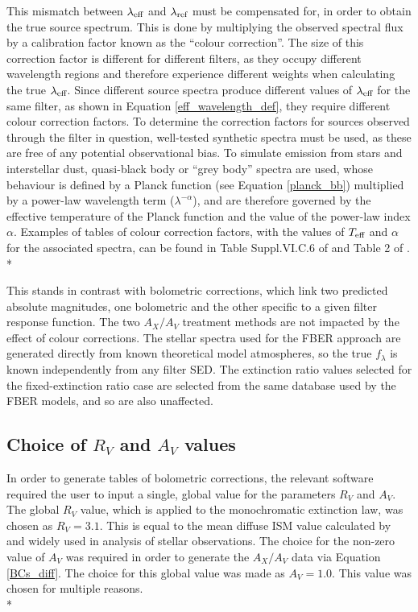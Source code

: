 \documentclass[12pt, a4paper]{report}
\begin{document}
This mismatch between $\lambda_{\textnormal{eff}}$ and $\lambda_{\textnormal{ref}}$ must be compensated for, in order to obtain the true source spectrum. This is done by multiplying the observed spectral flux by a calibration factor known as the ``colour correction''. The size of this correction factor is different for different filters, as they occupy different wavelength regions and therefore experience different weights when calculating the true $\lambda_{\textnormal{eff}}$. Since different source spectra produce different values of $\lambda_{\textnormal{eff}}$ for the same filter, as shown in Equation \ref{eff_wavelength_def}, they require different colour correction factors. To determine the correction factors for sources observed through the filter in question, well-tested synthetic spectra must be used, as these are free of any potential observational bias. To simulate emission from stars and interstellar dust, quasi-black body or ``grey body'' spectra are used, whose behaviour is defined by a Planck function (see Equation \ref{planck_bb}) multiplied by a power-law wavelength term ($\lambda^{-\alpha}$), and are therefore governed by the effective temperature of the Planck function and the value of the power-law index $\alpha$. Examples of tables of colour correction factors, with the values of $T_{\textnormal{eff}}$ and $\alpha$ for the associated spectra, can be found in Table Suppl.VI.C.6 of \cite{1988iras....1.....B} and Table 2 of \cite{2006A&A...447..769P}.\\*

This stands in contrast with bolometric corrections, which link two predicted absolute magnitudes, one bolometric and the other specific to a given filter response function. The two $A_{X}/A_{V}$ treatment methods are not impacted by the effect of colour corrections. The stellar spectra used for the FBER approach are generated directly from known theoretical model atmospheres, so the true $f_{\lambda}$ is known independently from any filter SED. The extinction ratio values selected for the fixed-extinction ratio case are selected from the same database used by the FBER models, and so are also unaffected.

\subsection{Choice of $R_{V}$ and $A_{V}$ values} \label{forbes}
In order to generate tables of bolometric corrections, the relevant software required the user to input a single, global value for the parameters $R_{V}$ and $A_{V}$. The global $R_{V}$ value, which is applied to the \cite{1989ApJ...345..245C} monochromatic extinction law, was chosen as $R_{V} = 3.1$. This is equal to the mean diffuse ISM value calculated by \cite{1985ApJ...288..618R} and widely used in analysis of stellar observations. The choice for the non-zero value of $A_{V}$ was required in order to generate the $A_{X}/A_{V}$ data via Equation \ref{BCs_diff}. The choice for this global value was made as $A_{V} = 1.0$. This value was chosen for multiple reasons.\\*
\end{document}
